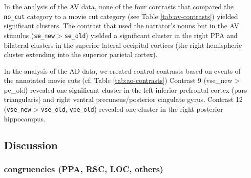 \documentclass[english]{article}
\begin{document}


In the analysis of the AV data, none of the four contrasts that compared the
\texttt{no\_cut} category to a movie cut category (see Table
\ref{tab:av-contrasts}) yielded significant clusters.
The contrast that used the narrator's nouns but in the AV stimulus
(\texttt{se\_new} > \texttt{se\_old}) yielded a significant cluster in the right
PPA and bilateral clusters in the superior lateral occipital cortices (the right
hemispheric cluster extending into the superior parietal cortex).

In the analysis of the AD data, we created control contrasts based on events of
the annotated movie cuts (cf. Table \ref{tab:ao-contrasts})
Contrast 9 (vse\_new > pe\_old) revealed one significant cluster in the left
inferior prefrontal cortex (pars triangularis) and right ventral
precuneus/posterior cingulate gyrus.
Contrast 12 (\texttt{vse\_new} > \texttt{vse\_old}, \texttt{vpe\_old}) revealed
one cluster in the right posterior hippocampus.


\subsection{Discussion}

\subsubsection{congruencies (PPA, RSC, LOC, others)}

\end{document}
